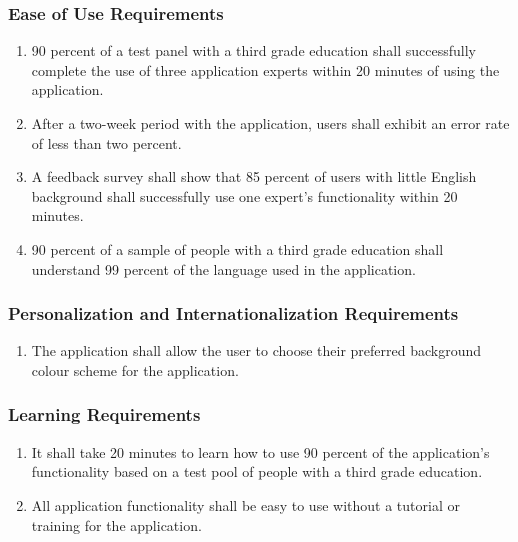 \documentclass[titlepage]{article}
\newcounter{myCounter}
\begin{document}
\subsubsection{Ease of Use Requirements}
\label{ssub:ease_of_use_requirements}
\begin{enumerate}[{UH}1. ]
    \setcounter{enumi}{\themyCounter}
    \item 90 percent of a test panel with a third grade education shall successfully complete the
    use of three application experts within 20 minutes of using the application. 
    \item After a two-week period with the application, users shall exhibit an error rate of less
    than two percent.
    \item A feedback survey shall show that 85 percent of users with little English background shall
    successfully use one expert's functionality within 20 minutes. 
    \item 90 percent of a sample of people with a third grade education shall understand 99 percent
    of the language used in the application.      
	\setcounter{myCounter}{\theenumi}
\end{enumerate}

\subsubsection{Personalization and Internationalization Requirements}
\label{ssub:personalization_and_internationalization_requirements}
\begin{enumerate}[{UH}1. ]
    \setcounter{enumi}{\themyCounter}
    \item The application shall allow the user to choose their preferred background colour scheme
    for the application.
    \setcounter{myCounter}{\theenumi}
\end{enumerate}

\subsubsection{Learning Requirements}
\label{ssub:learning_requirements}
\begin{enumerate}[{UH}1. ]
    \setcounter{enumi}{\themyCounter}
    \item It shall take 20 minutes to learn how to use 90 percent of the application's functionality
    based on a test pool of people with a third grade education.
    \item All application functionality shall be easy to use without a tutorial or training for the
    application.
    \setcounter{myCounter}{\theenumi}
\end{enumerate}
\end{document}
